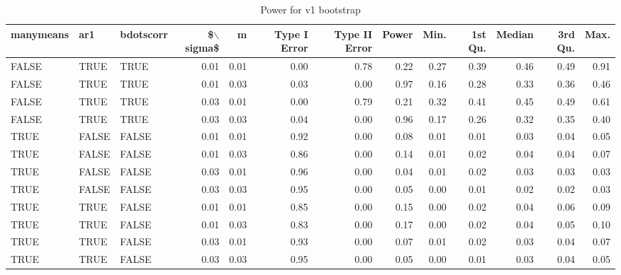 \begin{table}[ht]
\centering
\begin{tabular}{lllrrrrrrrrrr}
  \hline
manymeans & ar1 & bdotscorr & \$$\backslash$sigma\$ & m & Type I Error & Type II Error & Power & Min. & 1st Qu. & Median & 3rd Qu. & Max. \\ 
  \hline
FALSE & TRUE & TRUE & 0.01 & 0.01 & 0.00 & 0.78 & 0.22 & 0.27 & 0.39 & 0.46 & 0.49 & 0.91 \\ 
  FALSE & TRUE & TRUE & 0.01 & 0.03 & 0.03 & 0.00 & 0.97 & 0.16 & 0.28 & 0.33 & 0.36 & 0.46 \\ 
  FALSE & TRUE & TRUE & 0.03 & 0.01 & 0.00 & 0.79 & 0.21 & 0.32 & 0.41 & 0.45 & 0.49 & 0.61 \\ 
  FALSE & TRUE & TRUE & 0.03 & 0.03 & 0.04 & 0.00 & 0.96 & 0.17 & 0.26 & 0.32 & 0.35 & 0.40 \\ 
  TRUE & FALSE & FALSE & 0.01 & 0.01 & 0.92 & 0.00 & 0.08 & 0.01 & 0.01 & 0.03 & 0.04 & 0.05 \\ 
  TRUE & FALSE & FALSE & 0.01 & 0.03 & 0.86 & 0.00 & 0.14 & 0.01 & 0.02 & 0.04 & 0.04 & 0.07 \\ 
  TRUE & FALSE & FALSE & 0.03 & 0.01 & 0.96 & 0.00 & 0.04 & 0.01 & 0.02 & 0.03 & 0.03 & 0.03 \\ 
  TRUE & FALSE & FALSE & 0.03 & 0.03 & 0.95 & 0.00 & 0.05 & 0.00 & 0.01 & 0.02 & 0.02 & 0.03 \\ 
  TRUE & TRUE & FALSE & 0.01 & 0.01 & 0.85 & 0.00 & 0.15 & 0.00 & 0.02 & 0.04 & 0.06 & 0.09 \\ 
  TRUE & TRUE & FALSE & 0.01 & 0.03 & 0.83 & 0.00 & 0.17 & 0.00 & 0.02 & 0.04 & 0.05 & 0.10 \\ 
  TRUE & TRUE & FALSE & 0.03 & 0.01 & 0.93 & 0.00 & 0.07 & 0.01 & 0.02 & 0.03 & 0.04 & 0.07 \\ 
  TRUE & TRUE & FALSE & 0.03 & 0.03 & 0.95 & 0.00 & 0.05 & 0.00 & 0.01 & 0.03 & 0.04 & 0.05 \\ 
   \hline
\end{tabular}
\caption{Power for v1 bootstrap} 
\label{tab:bad_boot_pwr}
\end{table}
